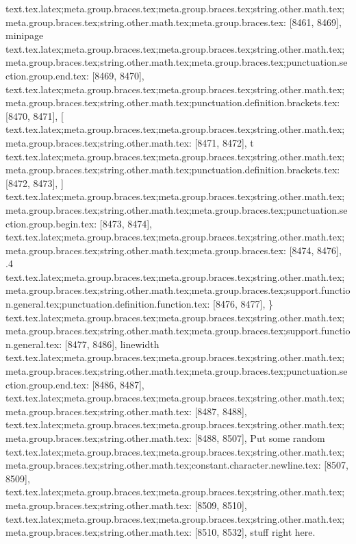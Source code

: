 {{{{{{{{{{{{{{{{{{{{{{{{{{{{{{{{{{{{{{{{{{{{{{{{{{{{{{{{{{{{{{{{{{{{{{{{{{{{{{{{{{{{{{{{{{{{{{{{{{{{{{{{{{{{{{{{{{{{{{{{{{{{{{{{{{{{{{{{{{{{{{{{{{{{{{{{{{{{{{{{{{{{{{{{{{{{{{{{{{{{{{{{{{{{{{{{{{{{{{{{{{{{{{{{{{{{{{{{{{{{{{{{{{{{{{{{{{{{{{{{{{{{{{{{{{{text.tex.latex;meta.group.braces.tex;meta.group.braces.tex;string.other.math.tex;meta.group.braces.tex;string.other.math.tex;meta.group.braces.tex: [8461, 8469], {minipage}
text.tex.latex;meta.group.braces.tex;meta.group.braces.tex;string.other.math.tex;meta.group.braces.tex;string.other.math.tex;meta.group.braces.tex;punctuation.section.group.end.tex: [8469, 8470], {}}
text.tex.latex;meta.group.braces.tex;meta.group.braces.tex;string.other.math.tex;meta.group.braces.tex;string.other.math.tex;punctuation.definition.brackets.tex: [8470, 8471], {[}
text.tex.latex;meta.group.braces.tex;meta.group.braces.tex;string.other.math.tex;meta.group.braces.tex;string.other.math.tex: [8471, 8472], {t}
text.tex.latex;meta.group.braces.tex;meta.group.braces.tex;string.other.math.tex;meta.group.braces.tex;string.other.math.tex;punctuation.definition.brackets.tex: [8472, 8473], {]}
text.tex.latex;meta.group.braces.tex;meta.group.braces.tex;string.other.math.tex;meta.group.braces.tex;string.other.math.tex;meta.group.braces.tex;punctuation.section.group.begin.tex: [8473, 8474], {{}
text.tex.latex;meta.group.braces.tex;meta.group.braces.tex;string.other.math.tex;meta.group.braces.tex;string.other.math.tex;meta.group.braces.tex: [8474, 8476], {.4}
text.tex.latex;meta.group.braces.tex;meta.group.braces.tex;string.other.math.tex;meta.group.braces.tex;string.other.math.tex;meta.group.braces.tex;support.function.general.tex;punctuation.definition.function.tex: [8476, 8477], {\}
text.tex.latex;meta.group.braces.tex;meta.group.braces.tex;string.other.math.tex;meta.group.braces.tex;string.other.math.tex;meta.group.braces.tex;support.function.general.tex: [8477, 8486], {linewidth}
text.tex.latex;meta.group.braces.tex;meta.group.braces.tex;string.other.math.tex;meta.group.braces.tex;string.other.math.tex;meta.group.braces.tex;punctuation.section.group.end.tex: [8486, 8487], {}}
text.tex.latex;meta.group.braces.tex;meta.group.braces.tex;string.other.math.tex;meta.group.braces.tex;string.other.math.tex: [8487, 8488], {
}
text.tex.latex;meta.group.braces.tex;meta.group.braces.tex;string.other.math.tex;meta.group.braces.tex;string.other.math.tex: [8488, 8507], {    Put some random}
text.tex.latex;meta.group.braces.tex;meta.group.braces.tex;string.other.math.tex;meta.group.braces.tex;string.other.math.tex;constant.character.newline.tex: [8507, 8509], {\\}
text.tex.latex;meta.group.braces.tex;meta.group.braces.tex;string.other.math.tex;meta.group.braces.tex;string.other.math.tex: [8509, 8510], {
}
text.tex.latex;meta.group.braces.tex;meta.group.braces.tex;string.other.math.tex;meta.group.braces.tex;string.other.math.tex: [8510, 8532], {    stuff right here.
}}}}}}}}}}}}}}}}}}}}}}}}}}}}}}}}}}}}}}}}}}}}}}}}}}}}}}}}}}}}}}}}}}}}}}}}}}}}}}}}}}}}}}}}}}}}}}}}}}}}}}}}}}}}}}}}}}}}}}}}}}}}}}}}}}}}}}}}}}}}}}}}}}}}}}}}}}}}}}}}}}}}}}}}}}}}}}}}}}}}}}}}}}}}}}}}}}}}}}}}}}}}}}}}}}}}}}}}}}}}}}}}}}}}}}}}}}}}}}}}}}}}}}}}}}}}
